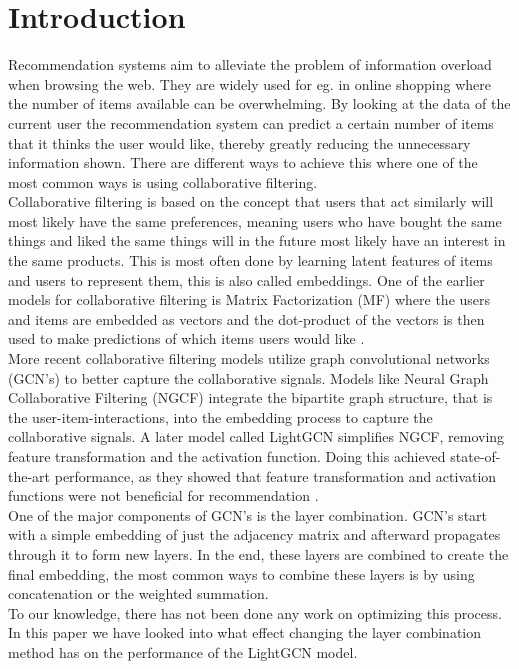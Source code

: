 \section{Introduction}
Recommendation systems aim to alleviate the problem of information overload when browsing the web.
They are widely used for eg. in online shopping where the number of items available can be overwhelming.
By looking at the data of the current user the recommendation system can predict a certain number of items that it thinks the user would like, thereby greatly reducing the unnecessary information shown.
There are different ways to achieve this where one of the most common ways is using collaborative filtering.
\\
Collaborative filtering is based on the concept that users that act similarly will most likely have the same preferences, meaning users who have bought the same things and liked the same things will in the future most likely have an interest in the same products.
This is most often done by learning latent features of items and users to represent them, this is also called embeddings.
One of the earlier models for collaborative filtering is Matrix Factorization (MF) where the users and items are embedded as vectors and the dot-product of the vectors is then used to make predictions of which items users would like \cite{Matrix-factorization-techniques}.
\\
More recent collaborative filtering models utilize graph convolutional networks (GCN's) to better capture the collaborative signals.
Models like Neural Graph Collaborative Filtering (NGCF) integrate the bipartite graph structure, that is the user-item-interactions, into the embedding process to capture the collaborative signals\cite{NGCF_2019}.
A later model called LightGCN simplifies NGCF, removing feature transformation and the activation function.
Doing this achieved state-of-the-art performance, as they showed that feature transformation and activation functions were not beneficial for recommendation \cite{lightgcn}.
\\
One of the major components of GCN's is the layer combination.
GCN's start with a simple embedding of just the adjacency matrix and afterward propagates through it to form new layers.
In the end, these layers are combined to create the final embedding, the most common ways to combine these layers is by using concatenation or the weighted summation.
\\
To our knowledge, there has not been done any work on optimizing this process.
In this paper we have looked into what effect changing the layer combination method has on the performance of the LightGCN model.
